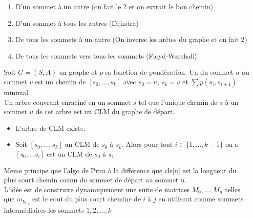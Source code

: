 \begin{enumerate}
	\item D'un sommet à un autre (on fait le 2 et on extrait le bon chemin)
	\item D'un sommet à tous les autres (Dijkstra)
	\item De tous les sommets à un autre (On inverse les arêtes du graphe et on fait 2)
	\item De tous les sommets vers tous les sommets (Floyd-Warshall)
\end{enumerate}

 Soit $G=(S,A)$ un graphe et $p$ sa fonction de pondération. Un  du sommet $u$ au sommet $v$ est un chemin de $[s_0,\ldots,s_k]$ avec $s_0=u$, $s_k=v$ et $\sum p(s_i,s_{i+1})$ minimal.\\

 Un arbre couvrant enraciné en un sommet $s$ tel que l'unique chemin de $s$ à un sommet $u$ de cet arbre est un CLM du graphe de départ. \\

\begin{itemize} 
	\item L'arbre de CLM existe.
	\item Soit $[s_0,\ldots,s_k]$ un CLM de $s_0$ à $s_k$. Alors pour tout $i\in\{1,\ldots,k-1\}$ on a $[s_0,\ldots s_i]$ est un CLM de $s_0$ à $s_i$
\end{itemize}

 Meme principe que l'algo de Prim à la différence que cle[u] est la longueur du plus court chemin connu du sommet de départ au sommet u.\\

 L'idée est de construire dynamiquement une suite de matrices $M_0,\ldots,M_n$ telles que $m_{k_{i,j}}$ est le cout du plus court chemine de $i$ à $j$ en utilisant comme sommets intermédiaires les sommets $1,2,\ldots ,k$
